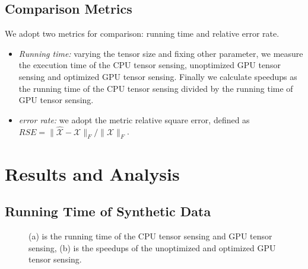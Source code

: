 \documentclass[futureinternet,article,submit,moreauthors,pdftex,10pt,a4paper]{Definitions/mdpi}
\theoremstyle{plain}
\theoremstyle{definition}
\theoremstyle{remark}
\begin{document}
\subsection{Comparison Metrics}
We adopt two metrics for comparison: running time and relative error rate.
\begin{itemize}
    \item \textit{Running time:} varying the tensor size and fixing other parameter, we measure the execution time of the CPU tensor sensing, unoptimized GPU tensor sensing and optimized GPU tensor sensing. Finally we calculate speedups as the running time of the CPU tensor sensing divided by the running time of GPU tensor sensing.
    \item \textit{error rate:} we adopt the metric relative square error, defined as $ RSE = \| \widehat{\mathcal{X}} - \mathcal{X} \|_F / \|\mathcal{X} \|_F $.
\end{itemize}

\section{Results and Analysis}
\label{SEC_RESULT}
\subsection{Running Time of Synthetic Data}
\begin{figure}[t]
    \centering
\caption{(a) is the running time of the CPU tensor sensing and GPU tensor sensing, (b) is the speedups of the unoptimized and optimized GPU tensor sensing.}
\end{figure}
\end{document}
